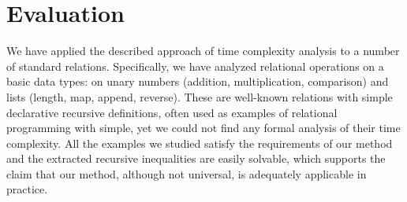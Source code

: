 \section{Evaluation}
\label{sec:evaluation}

We have applied the described approach of time complexity analysis to a number of standard \mK relations. Specifically, we have analyzed relational operations on a basic data types: on unary numbers (addition, multiplication, comparison) and lists (length, map, append, reverse). These are well-known relations with simple declarative recursive definitions, often used as examples of relational programming with simple, yet we could not find any formal analysis of their time complexity. All the examples we studied satisfy the requirements of our method and the extracted recursive inequalities are easily solvable, which supports the claim that our method, although not universal, is adequately applicable in practice.

